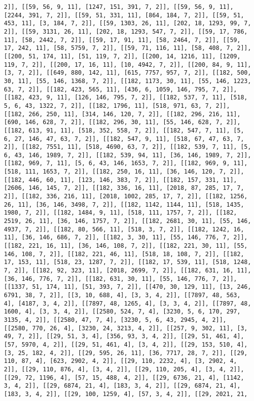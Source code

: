 \documentclass[12pt,fleqn]{article}\usepackage{../../common}
\begin{document}
\begin{verbatim}
2]], [[59, 56, 9, 11], [1247, 151, 391, 7, 2]], [[59, 56, 9, 11], [2244, 391, 7, 2]], [[59, 51, 331, 11], [864, 184, 7, 2]], [[59, 51, 453, 11], [3, 184, 7, 2]], [[59, 1303, 26, 11], [202, 18, 1293, 99, 7, 2]], [[59, 3131, 26, 11], [202, 18, 1293, 547, 7, 2]], [[59, 17, 786, 11], [58, 2442, 7, 2]], [[59, 17, 91, 11], [58, 2464, 7, 2]], [[59, 17, 242, 11], [58, 5759, 7, 2]], [[59, 71, 116, 11], [58, 408, 7, 2]], [[200, 51, 174, 11], [51, 119, 7, 2]], [[200, 14, 1216, 11], [1209, 119, 7, 2]], [[200, 17, 16, 11], [10, 4942, 7, 2]], [[200, 84, 9, 11], [3, 7, 2]], [[649, 880, 142, 11], [615, 7757, 957, 7, 2]], [[182, 500, 30, 11], [55, 146, 1368, 7, 2]], [[182, 1173, 30, 11], [55, 146, 1223, 63, 7, 2]], [[182, 423, 565, 11], [436, 6, 1059, 146, 795, 7, 2]], [[182, 423, 9, 11], [126, 146, 795, 7, 2]], [[182, 537, 7, 11], [518, 5, 6, 43, 1322, 7, 2]], [[182, 1796, 11], [518, 971, 63, 7, 2]], [[182, 266, 250, 11], [314, 146, 120, 7, 2]], [[182, 296, 216, 11], [690, 146, 628, 7, 2]], [[182, 296, 30, 11], [55, 146, 628, 7, 2]], [[182, 613, 91, 11], [518, 352, 558, 7, 2]], [[182, 547, 7, 11], [5, 6, 27, 146, 47, 63, 7, 2]], [[182, 547, 9, 11], [518, 67, 47, 63, 7, 2]], [[182, 7551, 11], [518, 4690, 63, 7, 2]], [[182, 539, 7, 11], [5, 6, 43, 146, 1989, 7, 2]], [[182, 539, 94, 11], [36, 146, 1989, 7, 2]], [[182, 969, 7, 11], [5, 6, 43, 146, 1653, 7, 2]], [[182, 969, 9, 11], [518, 111, 1653, 7, 2]], [[182, 250, 16, 11], [36, 146, 120, 7, 2]], [[182, 446, 60, 11], [123, 146, 383, 7, 2]], [[182, 157, 331, 11], [2606, 146, 145, 7, 2]], [[182, 336, 16, 11], [2018, 87, 285, 17, 7, 2]], [[182, 336, 216, 11], [2018, 1002, 285, 17, 7, 2]], [[182, 1256, 26, 11], [36, 146, 3498, 7, 2]], [[182, 1142, 1144, 11], [518, 1435, 1980, 7, 2]], [[182, 1484, 9, 11], [518, 111, 1757, 7, 2]], [[182, 2519, 26, 11], [36, 146, 1757, 7, 2]], [[182, 2681, 30, 11], [55, 146, 4937, 7, 2]], [[182, 80, 566, 11], [518, 3, 7, 2]], [[182, 1242, 16, 11], [36, 146, 686, 7, 2]], [[182, 3, 30, 11], [55, 146, 776, 7, 2]], [[182, 221, 16, 11], [36, 146, 108, 7, 2]], [[182, 221, 30, 11], [55, 146, 108, 7, 2]], [[182, 221, 46, 11], [518, 18, 108, 7, 2]], [[182, 17, 153, 11], [518, 23, 1287, 7, 2]], [[182, 17, 539, 11], [518, 1248, 7, 2]], [[182, 92, 323, 11], [2018, 2699, 7, 2]], [[182, 631, 16, 11], [36, 146, 776, 7, 2]], [[182, 631, 30, 11], [55, 146, 776, 7, 2]], [[1337, 51, 174, 11], [51, 393, 7, 2]], [[470, 30, 129, 11], [13, 246, 6791, 38, 7, 2]], [[3, 10, 688, 4], [3, 3, 4, 2]], [[7897, 48, 563, 4], [4187, 3, 4, 2]], [[7897, 48, 1265, 4], [3, 3, 4, 2]], [[7897, 48, 1600, 4], [3, 3, 4, 2]], [[2580, 524, 7, 4], [3230, 5, 6, 170, 297, 3135, 4, 2]], [[2580, 47, 7, 4], [3230, 5, 6, 43, 2945, 4, 2]], [[2580, 770, 26, 4], [3230, 24, 3213, 4, 2]], [[257, 9, 302, 11], [3, 49, 7, 2]], [[29, 51, 3, 4], [356, 93, 3, 4, 2]], [[29, 51, 461, 4], [57, 5970, 4, 2]], [[29, 51, 461, 4], [3, 4, 2]], [[29, 153, 510, 4], [3, 25, 182, 4, 2]], [[29, 595, 26, 11], [36, 7717, 28, 7, 2]], [[29, 110, 87, 4], [623, 2902, 4, 2]], [[29, 110, 2232, 4], [3, 2902, 4, 2]], [[29, 110, 876, 4], [3, 4, 2]], [[29, 110, 205, 4], [3, 4, 2]], [[29, 72, 1196, 4], [57, 15, 488, 4, 2]], [[29, 6736, 21, 4], [1142, 3, 4, 2]], [[29, 6874, 21, 4], [183, 3, 4, 2]], [[29, 6874, 21, 4], [183, 3, 4, 2]], [[29, 100, 1259, 4], [57, 3, 4, 2]], [[29, 2021, 21, 
\end{verbatim}
\end{document}
